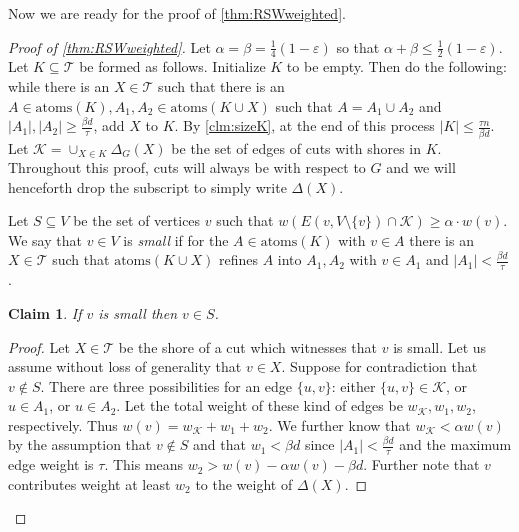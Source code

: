 \documentclass[10pt,a4paper]{article}
\newcommand{\Kcal}{\mathcal{K}}
\newcommand{\Tcal}{\mathcal{T}}
\newcommand{\atoms}{\mathrm{atoms}}
\newcommand{\1}{\mathbf{1}}
\newtheorem{claim}[theorem]{Claim}
\theoremstyle{definition}
\begin{document}
Now we are ready for the proof of \cref{thm:RSWweighted}.
\begin{proof}[Proof of \cref{thm:RSWweighted}]
Let $\alpha=\beta = \frac{1}{4} (1-\varepsilon)$ so that $\alpha + \beta \le \frac{1}{2}(1-\varepsilon)$.  
%
Let $K \subseteq \Tcal$ be formed as follows.  Initialize $K$ to be empty.  Then do the following: while there is an $X \in \Tcal$ such that 
there is an $A \in \atoms(K), A_1, A_2 \in \atoms(K \cup X)$ such that $A = A_1 \cup A_2$ and $|A_1|, |A_2| \ge \frac{\beta d}{\tau}$,
add $X$ to $K$.  
By \cref{clm:sizeK}, at the end of this process $|K| \le \frac{\tau n}{\beta d}$.  
Let $\Kcal = \cup_{X \in K} \Delta_G(X)$ be the set of edges of cuts with shores in $K$.  Throughout this proof, cuts will 
always be with respect to $G$ and we will henceforth drop the subscript to simply write $\Delta(X)$.  

Let $S \subseteq V$ be the set of vertices $v$ such that $w(E(v, V\setminus \{v\}) \cap \Kcal)  \ge \alpha \cdot w(v)$.  
We say that $v \in V$ is \emph{small} if for the $A \in \atoms(K)$ with $v \in A$ there is an $X \in \Tcal$
such that $\atoms(K \cup X)$ refines $A$ into $A_1, A_2$ with $v \in A_1$ and $|A_1| < \frac{\beta d}{\tau}$.  

\begin{claim}
\label{clm:small}
If $v$ is small then $v \in S$.
\end{claim}

\begin{proof}
Let $X \in \Tcal$ be the shore of a cut which witnesses that $v$ is small.  Let us assume without loss of generality that $v \in X$.  
Suppose for contradiction that $v \not \in S$.  There are three possibilities for an edge $\{u,v\}$:  either $\{u,v\} \in \Kcal$, 
or $u \in A_1$, or $u \in A_2$.  Let the total weight of these kind of edges be $w_\Kcal, w_1, w_2$, respectively.  
Thus $w(v) = w_\Kcal + w_1 + w_2$.  We further know that $w_\Kcal < \alpha w(v)$ by the assumption that $v \not \in S$ and that $w_1 < \beta d$ since $|A_1| < \frac{\beta d}{\tau}$ 
and the maximum edge weight is $\tau$.  This means $w_2 > w(v) - \alpha w(v) - \beta d$.  Further note that $v$ contributes weight at least 
$w_2$ to the weight of $\Delta(X)$.  


\end{proof}
\end{proof}
\end{document}
